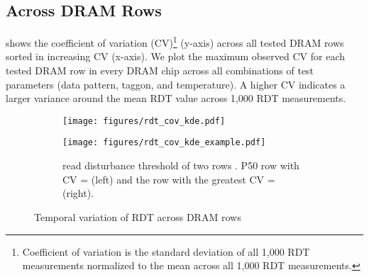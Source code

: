
\noindent
\subsection{\phenomenon{} Across DRAM Rows}
\label{subsec:across-rows}
 shows  the coefficient of variation
(CV)\footnote{Coefficient of variation is the standard deviation of all 1,000
RDT measurements normalized to the mean across all 1,000 RDT measurements.}
(y-axis) across all tested DRAM rows sorted in increasing CV (x-axis). We plot
the maximum observed CV for each tested DRAM row in every DRAM chip across all
combinations of test parameters (data pattern, \gls{taggon}, and temperature). A
higher CV indicates a larger variance around the mean RDT value across 1,000 RDT
measurements. 

\begin{figure}[!ht]
    \centering
    \begin{subfigure}[!h]{\linewidth}  
    \texttt{[image: figures/rdt\_cov\_kde.pdf]}
    \vspace{-6mm}
    \caption{}
    \label{fig:rdt_cov_all}
    \end{subfigure}
    \begin{subfigure}[!h]{\linewidth}
    \texttt{[image: figures/rdt\_cov\_kde\_example.pdf]}
    \vspace{-6mm}
    \caption{ read disturbance threshold  of
    two rows . P50 row with CV =
     (left) and the  row with the greatest
    CV =  (right).}
    \label{fig:rdt_cov_example}   
    \end{subfigure}
    \caption{Temporal variation of RDT across DRAM rows}
    \label{fig:rdt_cov_both}
\end{figure}

